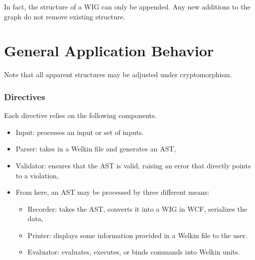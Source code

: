 In fact, the structure of a WIG can only be appended. Any new additions to the graph do not remove existing structure.




\section{General Application Behavior}

Note that all apparent structures may be adjusted under cryptomorphism.


\subsubsection*{Directives}
Each directive relies on the following components.
\begin{itemize}
  \item Input: processes an input or set of inputs.
  \item Parser: takes in a Welkin file and generates an AST,
  \item Validator: ensures that the AST is valid, raising an error that directly points to a violation,
  \item From here, an AST may be processed by three different means:
		\begin{itemize}
		  \item Recorder: takes the AST, converts it into a WIG in WCF, serializes the data,
		  \item Printer: displays some information provided in a Welkin file to the user.
		  \item Evaluator: evaluates, executes, or binds commands into Welkin units.
		\end{itemize}
\end{itemize}

